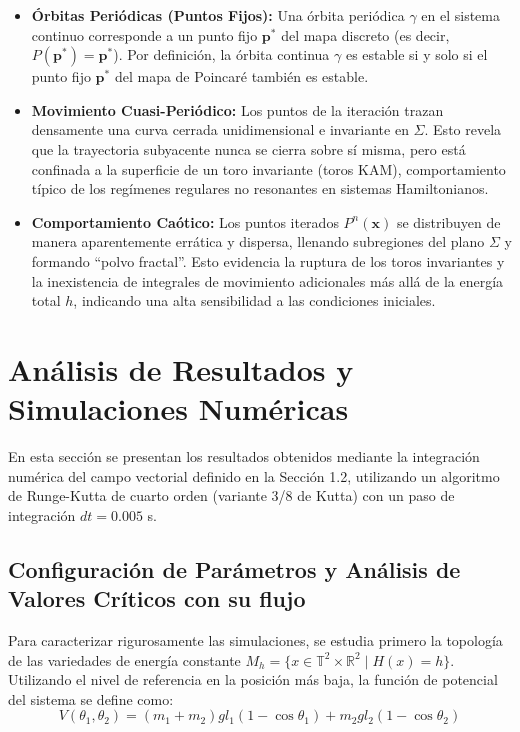 \documentclass[13pt]{extarticle}
\begin{document}
\begin{itemize}
    \item \textbf{Órbitas Periódicas (Puntos Fijos):} Una órbita periódica $\gamma$ en el sistema continuo corresponde a un punto fijo $\mathbf{p}^*$ del mapa discreto (es decir, $P(\mathbf{p}^*) = \mathbf{p}^*$). Por definición, la órbita continua $\gamma$ es estable si y solo si el punto fijo $\mathbf{p}^*$ del mapa de Poincaré también es estable.
    
    \item \textbf{Movimiento Cuasi-Periódico:} Los puntos de la iteración trazan densamente una curva cerrada unidimensional e invariante en $\Sigma$. Esto revela que la trayectoria subyacente nunca se cierra sobre sí misma, pero está confinada a la superficie de un toro invariante (toros KAM), comportamiento típico de los regímenes regulares no resonantes en sistemas Hamiltonianos.
    
    \item \textbf{Comportamiento Caótico:} Los puntos iterados $P^n(\mathbf{x})$ se distribuyen de manera aparentemente errática y dispersa, llenando subregiones del plano $\Sigma$ y formando ``polvo fractal''. Esto evidencia la ruptura de los toros invariantes y la inexistencia de integrales de movimiento adicionales más allá de la energía total $h$, indicando una alta sensibilidad a las condiciones iniciales.
\end{itemize}

\section{Análisis de Resultados y Simulaciones Numéricas}

En esta sección se presentan los resultados obtenidos mediante la integración numérica del campo vectorial definido en la Sección 1.2, utilizando un algoritmo de Runge-Kutta de cuarto orden (variante 3/8 de Kutta) con un paso de integración $dt = 0.005$ s.

\subsection{Configuración de Parámetros y Análisis de Valores Críticos con su flujo}

Para caracterizar rigurosamente las simulaciones, se estudia primero la topología de las variedades de energía constante $M_h = \{x \in \mathbb{T}^2 \times \mathbb{R}^2 \mid H(x) = h\}$. Utilizando el nivel de referencia en la posición más baja, la función de potencial del sistema se define como:
\begin{equation}
    V(\theta_1, \theta_2) = (m_1 + m_2)gl_1(1 - \cos\theta_1) + m_2gl_2(1 - \cos\theta_2)
\end{equation}
\end{document}
